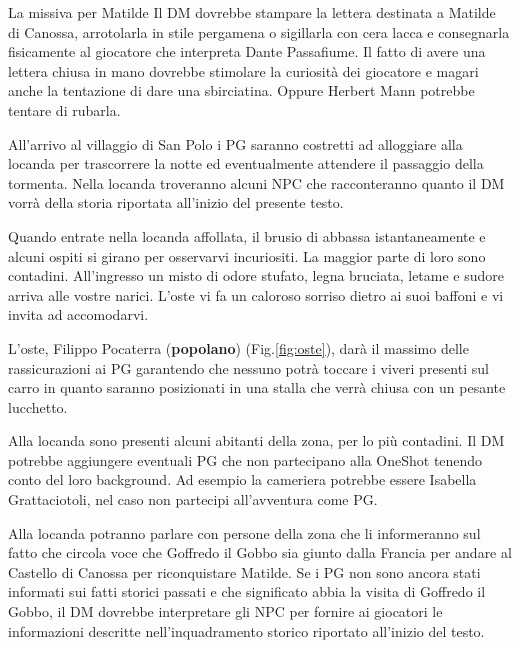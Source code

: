 \documentclass[letterpaper,twocolumn,openany,nodeprecatedcode]{dndbook}
\begin{document}
\begin{DndSidebar}{La missiva per Matilde}
Il DM dovrebbe stampare la lettera destinata a Matilde di Canossa, arrotolarla in stile pergamena o sigillarla con cera lacca e consegnarla fisicamente al giocatore che interpreta Dante Passafiume. Il fatto di avere una lettera chiusa in mano dovrebbe stimolare la curiosità dei giocatore e magari anche la tentazione di dare una sbirciatina. Oppure Herbert Mann potrebbe tentare di rubarla.
\end{DndSidebar}

All'arrivo al villaggio di San Polo i PG saranno costretti ad alloggiare alla locanda per trascorrere la notte ed eventualmente attendere il passaggio della tormenta. Nella locanda troveranno alcuni NPC che racconteranno quanto il DM vorrà della storia riportata all'inizio del presente testo.

\begin{DndReadAloud}
Quando entrate nella locanda affollata, il brusio di abbassa istantaneamente e alcuni ospiti si girano per osservarvi incuriositi. La maggior parte di loro sono contadini. All'ingresso un misto di odore stufato, legna bruciata, letame e sudore arriva alle vostre narici. L'oste vi fa un caloroso sorriso dietro ai suoi baffoni e vi invita ad accomodarvi.
\end{DndReadAloud}

L'oste, Filippo Pocaterra (\textbf{popolano}) (Fig.\ref{fig:oste}), darà il massimo delle rassicurazioni ai PG garantendo che nessuno potrà toccare i viveri presenti sul carro in quanto saranno posizionati in una stalla che verrà chiusa con un pesante lucchetto.




Alla locanda sono presenti alcuni abitanti della zona, per lo più contadini. Il DM potrebbe aggiungere eventuali PG che non partecipano alla OneShot tenendo conto del loro background. Ad esempio la cameriera potrebbe essere Isabella Grattaciotoli, nel caso non partecipi all'avventura come PG.

Alla locanda potranno parlare con persone della zona che li informeranno sul fatto che circola voce che Goffredo il Gobbo sia giunto dalla Francia per andare al Castello di Canossa per riconquistare Matilde. Se i PG non sono ancora stati informati sui fatti storici passati e che significato abbia la visita di Goffredo il Gobbo, il DM dovrebbe interpretare gli NPC per fornire ai giocatori le informazioni descritte nell'inquadramento storico riportato all'inizio del testo.
\end{document}

